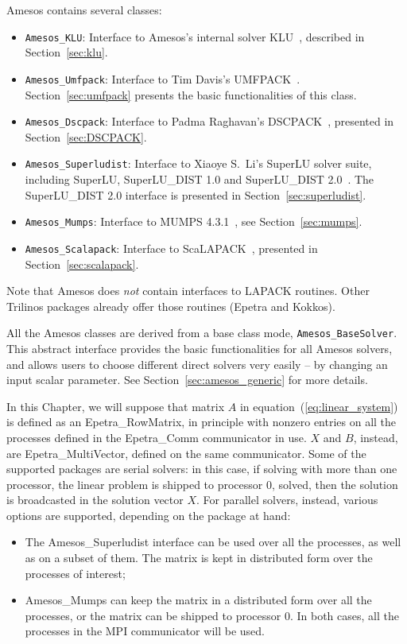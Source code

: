 Amesos contains several classes: 
\begin{itemize}
\item \verb!Amesos_KLU!: Interface to Amesos's internal solver
  KLU~\cite{KLU}, described in Section~\ref{sec:klu}.
\item \verb!Amesos_Umfpack!: Interface to Tim Davis's
  UMFPACK~\cite{umfpack-home-page}. Section~\ref{sec:umfpack} presents the basic
  functionalities of this class.
\item \verb!Amesos_Dscpack!: Interface to Padma Raghavan's
  DSCPACK~\cite{dscpack-home-page}, presented in Section~\ref{sec:DSCPACK}.
\item \verb!Amesos_Superludist!: Interface to Xiaoye S.~Li's SuperLU
  solver suite, including SuperLU, SuperLU\_DIST 1.0 and SuperLU\_DIST
  2.0~\cite{superlu-home-page}. The SuperLU\_DIST 2.0 interface is
  presented in Section~\ref{sec:superludist}.
\item \verb!Amesos_Mumps!: Interface to MUMPS 4.3.1~\cite{mumps-home-page}, see
  Section~\ref{sec:mumps}.
\item \verb!Amesos_Scalapack!: Interface to ScaLAPACK~\cite{scalapack}, 
  presented in Section~\ref{sec:scalapack}.
\end{itemize}


Note that Amesos does {\sl not} contain interfaces to LAPACK routines.
Other Trilinos packages already offer those routines (Epetra and
Kokkos).

All the Amesos classes are derived from a base class mode,
\verb!Amesos_BaseSolver!. This abstract interface provides the basic
functionalities for all Amesos solvers, and allows users to choose
different direct solvers very easily -- by changing an input scalar
parameter. See Section~\ref{sec:amesos_generic} for more details.

In this Chapter, we will suppose that matrix $A$ in
equation~(\ref{eq:linear_system}) is defined as an Epetra\_RowMatrix, in
principle with nonzero entries on all the processes defined in the
Epetra\_Comm communicator in use. $X$ and $B$, instead, are
Epetra\_MultiVector, defined on the same communicator.  Some of the
supported packages are serial solvers: in this case, if solving with
more than one processor, the linear problem is shipped to processor 0,
solved, then the solution is broadcasted in the solution vector $X$. For
parallel solvers, instead, various options are supported, depending on
the package at hand:
\begin{itemize}
\item The Amesos\_Superludist interface can be used over all the
  processes, as well as on a subset of them. The matrix is kept in
  distributed form over the processes of interest;
\item Amesos\_Mumps can keep the matrix in a distributed form over all
  the processes, or the matrix can be shipped to processor 0. In both
  cases, all the processes in the MPI communicator will be used.
\end{itemize}

